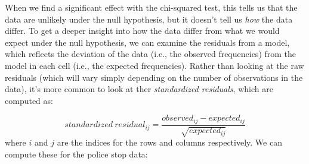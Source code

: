 \documentclass[]{book}
\newenvironment{Shaded}{\begin{snugshade}}{\end{snugshade}}
\newcommand{\KeywordTok}[1]{\textcolor[rgb]{0.13,0.29,0.53}{\textbf{#1}}}
\newcommand{\DataTypeTok}[1]{\textcolor[rgb]{0.13,0.29,0.53}{#1}}
\newcommand{\StringTok}[1]{\textcolor[rgb]{0.31,0.60,0.02}{#1}}
\newcommand{\CommentTok}[1]{\textcolor[rgb]{0.56,0.35,0.01}{\textit{#1}}}
\newcommand{\OperatorTok}[1]{\textcolor[rgb]{0.81,0.36,0.00}{\textbf{#1}}}
\newcommand{\NormalTok}[1]{#1}
\theoremstyle{definition}
\theoremstyle{definition}
\theoremstyle{definition}
\theoremstyle{remark}
\begin{document}
When we find a significant effect with the chi-squared test, this tells
us that the data are unlikely under the null hypothesis, but it doesn't
tell us \emph{how} the data differ. To get a deeper insight into how the
data differ from what we would expect under the null hypothesis, we can
examine the residuals from a model, which reflects the deviation of the
data (i.e., the observed frequencies) from the model in each cell (i.e.,
the expected frequencies). Rather than looking at the raw residuals
(which will vary simply depending on the number of observations in the
data), it's more common to look at ther \emph{standardized residuals},
which are computed as:

\[
standardized\ residual_{ij} = \frac{observed_{ij} - expected_{ij}}{\sqrt{expected_{ij}}}
\] where \(i\) and \(j\) are the indices for the rows and columns
respectively. We can compute these for the police stop data:

\begin{Shaded}
\end{Shaded}
\end{document}

